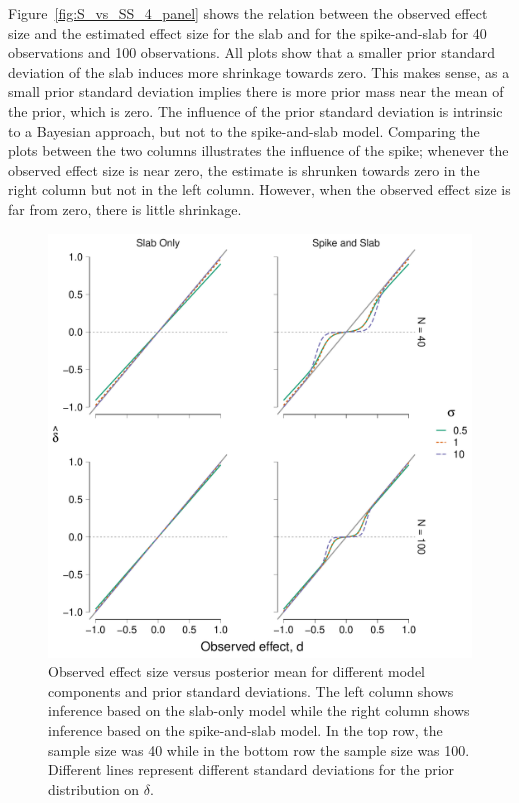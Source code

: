\documentclass[a4paper]{article}
\newenvironment{revision}{\color{teal}}{\color{black}}
\begin{document}
\begin{revision}
Figure~\ref{fig:S_vs_SS_4_panel} shows the relation between the observed effect size and the estimated effect size for the slab and for the spike-and-slab for 40 observations and 100 observations.
All plots show that a smaller prior standard deviation of the slab induces more shrinkage towards zero.
This makes sense, as a small prior standard deviation implies there is more prior mass near the mean of the prior, which is zero.
The influence of the prior standard deviation is intrinsic to a Bayesian approach, but not to the spike-and-slab model.
Comparing the plots between the two columns illustrates the influence of the spike; whenever the observed effect size is near zero, the estimate is shrunken towards zero in the right column but not in the left column.
However, when the observed effect size is far from zero, there is little shrinkage.
\begin{figure}[!ht]
	\includegraphics[width=\textwidth]{posteriorMeanVsSampleDelta_4_panel_big_font.pdf}
	\caption{%
		Observed effect size versus posterior mean for different model components and prior standard deviations.
		The left column shows inference based on the slab-only model while the right column shows inference based on the spike-and-slab model.
		In the top row, the sample size was 40 while in the bottom row the sample size was 100.
		Different lines represent different standard deviations for the prior distribution on $\delta$.
}
\end{figure}
\end{revision}
\end{document}
